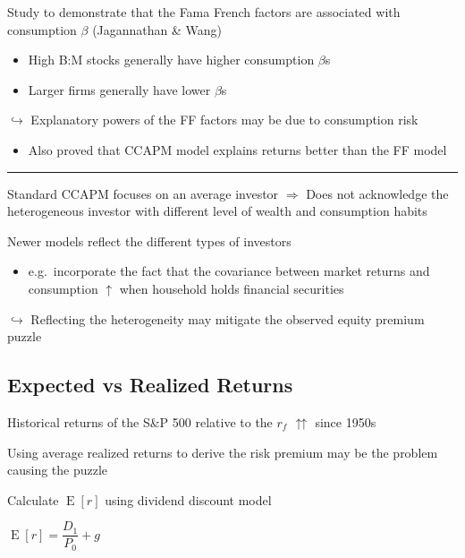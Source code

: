 \documentclass[]{book}
\providecommand{\tightlist}{%
  \setlength{\itemsep}{0pt}\setlength{\parskip}{0pt}}
\theoremstyle{definition}
\theoremstyle{definition}
\theoremstyle{remark}
\begin{document}
Study to demonstrate that the Fama French factors are associated with
consumption \(\beta\) (Jagannathan \& Wang)

\begin{itemize}
\item
  High B:M stocks generally have higher consumption \(\beta\)s
\item
  Larger firms generally have lower \(\beta\)s
\end{itemize}

\(\hookrightarrow\) Explanatory powers of the FF factors may be due to
consumption risk

\begin{itemize}
\tightlist
\item
  Also proved that CCAPM model explains returns better than the FF model
\end{itemize}

\begin{center}\rule{0.5\linewidth}{\linethickness}\end{center}

Standard CCAPM focuses on an average investor \(\Rightarrow\) Does not
acknowledge the heterogeneous investor with different level of wealth
and consumption habits

Newer models reflect the different types of investors

\begin{itemize}
\tightlist
\item
  e.g.~incorporate the fact that the covariance between market returns
  and consumption \(\uparrow\) when household holds financial securities
\end{itemize}

\(\hookrightarrow\) Reflecting the heterogeneity may mitigate the
observed equity premium puzzle

\subsection{Expected vs Realized
Returns}\label{expected-vs-realized-returns}

Historical returns of the S\&P 500 relative to the \(r_f\)
\(\upuparrows\) since 1950s

Using average realized returns to derive the risk premium may be the
problem causing the puzzle

Calculate \(\operatorname{E}[r]\) using dividend discount model

\(\operatorname{E}[r] = \dfrac{D_1}{P_0} + g\)
\end{document}
